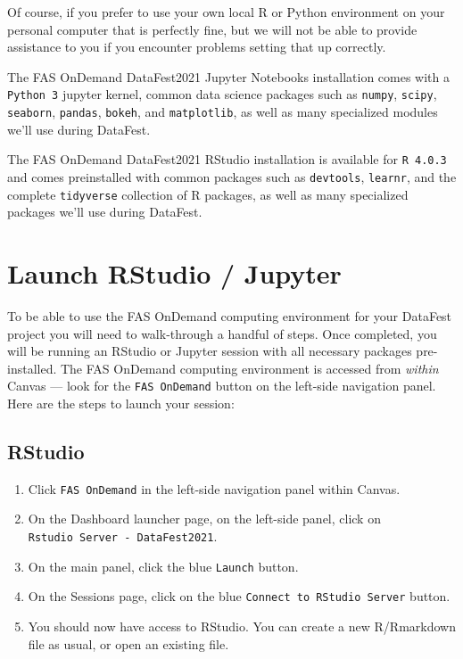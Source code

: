 \documentclass[]{book}
\providecommand{\tightlist}{%
  \setlength{\itemsep}{0pt}\setlength{\parskip}{0pt}}
\begin{document}
Of course, if you prefer to use your own local R or Python environment on your personal computer that is perfectly fine, but we will not be able to provide assistance to you if you encounter problems setting that up correctly.

The FAS OnDemand DataFest2021 Jupyter Notebooks installation comes with a \texttt{Python\ 3} jupyter kernel, common data science packages such as \texttt{numpy}, \texttt{scipy}, \texttt{seaborn}, \texttt{pandas}, \texttt{bokeh}, and \texttt{matplotlib}, as well as many specialized modules we'll use during DataFest.

The FAS OnDemand DataFest2021 RStudio installation is available for \texttt{R\ 4.0.3} and comes preinstalled with common packages such as \texttt{devtools}, \texttt{learnr}, and the complete \texttt{tidyverse} collection of R packages, as well as many specialized packages we'll use during DataFest.

\hypertarget{launch-rstudio-jupyter}{%
\chapter*{Launch RStudio / Jupyter}\label{launch-rstudio-jupyter}}

To be able to use the FAS OnDemand computing environment for your DataFest project you will need to walk-through a handful of steps. Once completed, you will be running an RStudio or Jupyter session with all necessary packages pre-installed. The FAS OnDemand computing environment is accessed from \emph{within} Canvas --- look for the \texttt{FAS\ OnDemand} button on the left-side navigation panel. Here are the steps to launch your session:

\hypertarget{rstudio}{%
\section{RStudio}\label{rstudio}}

\begin{enumerate}
\def\labelenumi{\arabic{enumi}.}
\tightlist
\item
  Click \texttt{FAS\ OnDemand} in the left-side navigation panel within Canvas.
\item
  On the Dashboard launcher page, on the left-side panel, click on \texttt{Rstudio\ Server\ -\ DataFest2021}.
\item
  On the main panel, click the blue \texttt{Launch} button.
\item
  On the Sessions page, click on the blue \texttt{Connect\ to\ RStudio\ Server} button.
\item
  You should now have access to RStudio. You can create a new R/Rmarkdown file as usual, or open an existing file.
\end{enumerate}
\end{document}
